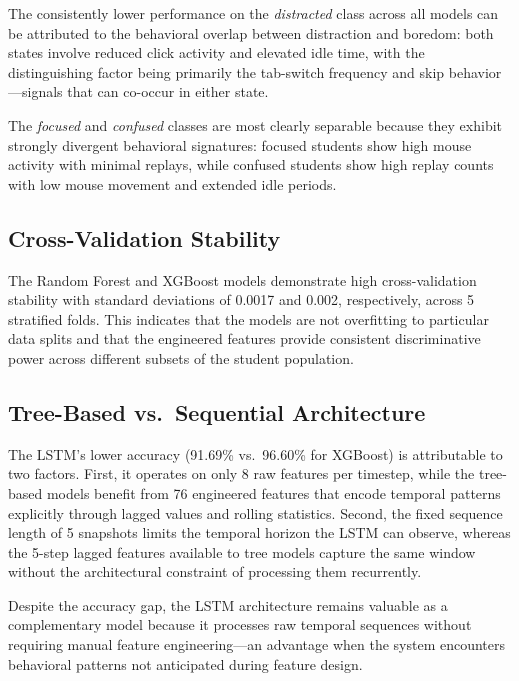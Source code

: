 \documentclass[conference]{IEEEtran}
\begin{document}
The consistently lower performance on the \textit{distracted} class across all models can be attributed to the behavioral overlap between distraction and boredom: both states involve reduced click activity and elevated idle time, with the distinguishing factor being primarily the tab-switch frequency and skip behavior---signals that can co-occur in either state.

The \textit{focused} and \textit{confused} classes are most clearly separable because they exhibit strongly divergent behavioral signatures: focused students show high mouse activity with minimal replays, while confused students show high replay counts with low mouse movement and extended idle periods.

\subsection{Cross-Validation Stability}

The Random Forest and XGBoost models demonstrate high cross-validation stability with standard deviations of 0.0017 and 0.002, respectively, across 5 stratified folds. This indicates that the models are not overfitting to particular data splits and that the engineered features provide consistent discriminative power across different subsets of the student population.

\subsection{Tree-Based vs.\ Sequential Architecture}

The LSTM's lower accuracy (91.69\% vs.\ 96.60\% for XGBoost) is attributable to two factors. First, it operates on only 8 raw features per timestep, while the tree-based models benefit from 76 engineered features that encode temporal patterns explicitly through lagged values and rolling statistics. Second, the fixed sequence length of 5 snapshots limits the temporal horizon the LSTM can observe, whereas the 5-step lagged features available to tree models capture the same window without the architectural constraint of processing them recurrently.

Despite the accuracy gap, the LSTM architecture remains valuable as a complementary model because it processes raw temporal sequences without requiring manual feature engineering---an advantage when the system encounters behavioral patterns not anticipated during feature design.

\end{document}
